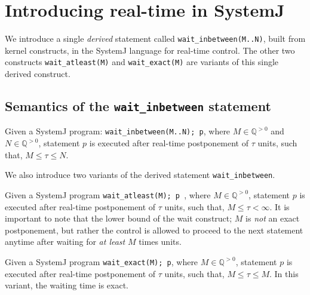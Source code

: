 \section{Introducing real-time in SystemJ}
\label{sec:intr-real-time}

We introduce a single \textit{derived} statement called
\texttt{wait\-\_inbetween(M..N)}, built from kernel constructs, in the
SystemJ language for real-time control. The other two constructs
\texttt{wait\-\_atleast(M)} and \mbox{\texttt{wait\_exact(M)}} are
variants of this single derived construct.



\subsection{Semantics of the \texttt{wait\_inbetween} statement}
\label{sec:semant-delay-stat}


Given a  SystemJ program:  \texttt{wait\_inbetween(M..N); p},  where $M
\in  \mathbb{Q}^{>0}$  and $N  \in  \mathbb{Q}^{>0}$,  statement $p$  is
executed after  real-time postponement  of $\tau$  units, such  that, $M
\leq \tau \leq N$.

We also introduce two variants of the derived statement
\texttt{wait\_inbetween}.
\begin{enumerate*}
\item Given a SystemJ program \texttt{wait\_atleast(M); p }, where $M \in
	\mathbb{Q}^{>0}$, statement $p$ is executed after real-time
	postponement of $\tau$ units, such that, $M \leq \tau < \infty$. It is
	important to note that the lower bound of the wait construct; $M$ is
	\textit{not} an exact postponement, but rather the control is allowed
	to proceed to the next statement anytime after waiting for \textit{at
	least} $M$ times units.
\item Given a SystemJ program \texttt{wait\_exact(M); p}, where $M \in
  \mathbb{Q}^{>0}$, statement $p$ is executed after real-time
  postponement of $\tau$ units, such that, $M \leq \tau \leq M$. In this
  variant, the waiting time is exact.
\end{enumerate*}

